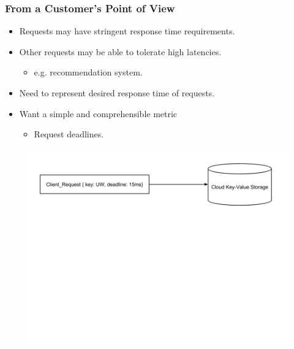\documentclass{beamer}
\newcommand{\myv}{\vspace{3 mm}}
\begin{document}
\begin{frame}
  \frametitle{From a Customer's Point of View}
\myv
  \begin{itemize}
  \item Requests may have stringent response time requirements.
    \myv
  \item Other requests may be able to tolerate high latencies.
    \begin{itemize}
    \item e.g. recommendation system.
    \end{itemize}
    \myv
  \item Need to represent desired response time of requests.
    \myv
  \item Want a simple and comprehensible metric
    \begin{itemize}
    \item Request deadlines.
    \end{itemize}
  \end{itemize}
\vspace{-5 mm}
  \begin{figure}
    \includegraphics[scale=0.35]{img/Request_Deadline_Example.png}
  \end{figure}
\end{frame}
\end{document}
